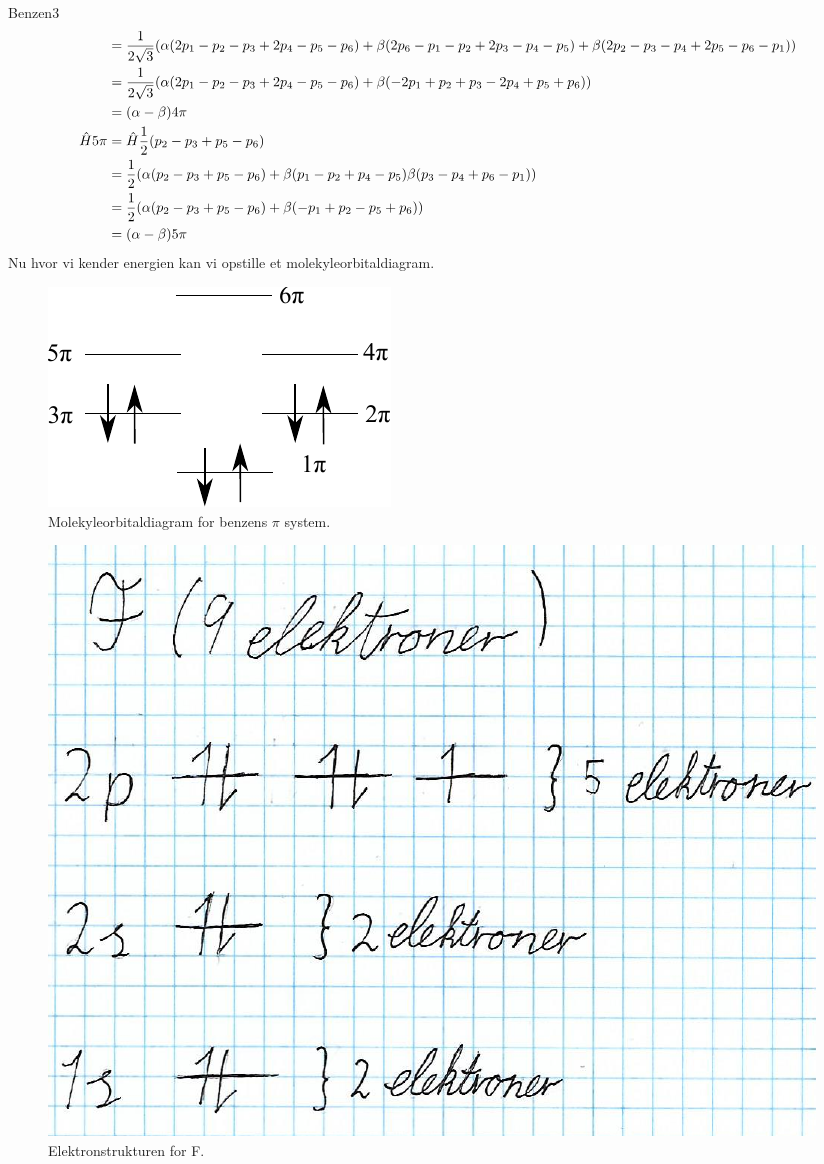 \begin{opgave}{Benzen}{3}
\begin{align*}
&=\frac{1}{2\sqrt{3}}(\alpha(2p_1-p_2-p_3+2p_4-p_5-p_6)+\beta(2p_6-p_1-p_2+2p_3-p_4-p_5)+\beta(2p_2-p_3-p_4+2p_5-p_6-p_1))\\
&=\frac{1}{2\sqrt{3}}(\alpha(2p_1-p_2-p_3+2p_4-p_5-p_6)+\beta(-2p_1+p_2+p_3-2p_4+p_5+p_6))\\
&=(\alpha-\beta)4\pi\\
\hat H 5\pi &= \hat H\frac{1}{2}(p_2-p_3+p_5-p_6)\\
&= \frac{1}{2}(\alpha(p_2-p_3+p_5-p_6)+\beta(p_1-p_2+p_4-p_5)\beta(p_3-p_4+p_6-p_1))\\
&= \frac{1}{2}(\alpha(p_2-p_3+p_5-p_6)+\beta(-p_1+p_2-p_5+p_6))\\
&=(\alpha-\beta)5\pi
\end{align*}
Nu hvor vi kender energien kan vi opstille et molekyleorbitaldiagram.
\begin{figure}[h]
\center
\includegraphics[width = \textwidth]{Atom-ogMolekylefysik/billeder/benzenMO.pdf}
\caption{Molekyleorbitaldiagram for benzens $\pi$ system.}
\end{figure}
\end{opgave}
\begin{figure}[t]
	\centering
	\includegraphics[width=\columnwidth]{Atom-ogMolekylefysik/billeder/F.pdf}
	\caption{Elektronstrukturen for F.} \label{fig:F}
\end{figure}
